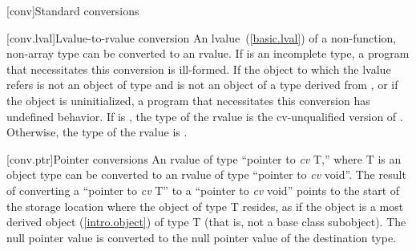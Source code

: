 \documentclass[american]{book}
\begin{document}
[conv]{Standard conversions}
\begin{paras}
\setcounter{section}{0}
[conv.lval]{Lvalue-to-rvalue conversion}
\pnum
An lvalue~(\ref{basic.lval}) of a non-function, non-array type 
can be converted to an rvalue. If  is an incomplete type, a
program that necessitates this conversion is ill-formed. If the object
to which the lvalue refers is not an object of type  and is not
an object of a type derived from , or if the object is
uninitialized, a program that necessitates this conversion has undefined
behavior. If  is 
,
the type of the rvalue is
the cv-unqualified version of . Otherwise, the type of the
rvalue is .


\setcounter{section}{9}
[conv.ptr]{Pointer conversions}
\setcounter{Paras}{1}
\pnum
An rvalue of type ``pointer to \emph{cv} T,'' where T is an
object type can be converted to an rvalue of type ``pointer to \emph{cv}
void''.  The result of converting a ``pointer to \emph{cv} T'' to a
``pointer to \emph{cv} void'' points to the start of the storage location
where the object of type T resides, as if the object is a most derived
object (\ref{intro.object}) of type T (that is, not a base class
subobject). The null pointer value is converted to the null pointer value
of the destination type. 


\end{paras}
\end{document}
